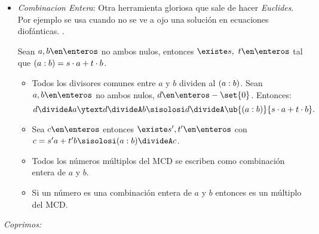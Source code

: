 \begin{itemize}[label=\tiny{}]
  \item \textit{Combinacion Entera}: Otra herramienta gloriosa que sale de hacer \textit{Euclides}. Por ejemplo
        se usa cuando no se ve a ojo una solución en ecuaciones diofánticas.
        .\par
        Sean $a,b \en \enteros$ no ambos nulos, entonces $\existe s,\ t \en \enteros$ tal que $(a:b) = s\cdot a + t \cdot b$.
        \begin{itemize}[label=\tiny{}]
          \item Todos los divisores comunes entre $a$ y $b$ dividen al $(a:b)$. Sean $a,b \en \enteros$ no ambos nulos, $d \en \enteros - \set{0}$. Entonces:
                $$
                  d \divideA a \ytext d \divideA b \sisolosi d \divideA \ub{\mcd}{\cz}.
                $$

          \item Sea $c \en \enteros$ entonces $\existe s', t' \en \enteros$ con $c = s'a + t'b \sisolosi \mcd \divideA c$.

          \item Todos los números múltiplos del MCD se escriben como combinación entera de $a$ y $b$.

          \item Si un número es una combinación entera de $a$ y $b$ entonces es un múltiplo del MCD.
        \end{itemize}
\end{itemize}

\bigskip

\textit{Coprimos: }

